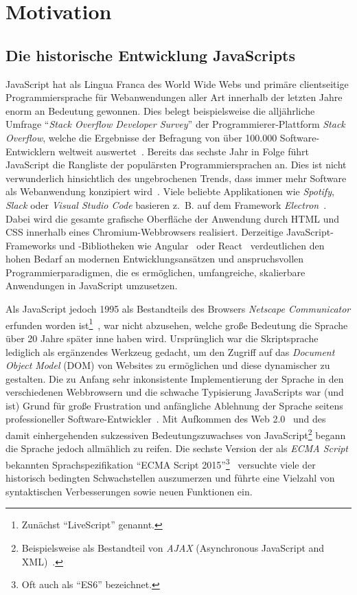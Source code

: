 \chapter{Motivation}

\section{Die historische Entwicklung JavaScripts}

JavaScript hat als Lingua Franca des World Wide Webs und primäre clientseitige Programmiersprache für Webanwendungen aller Art innerhalb der letzten Jahre enorm an Bedeutung gewonnen. Dies belegt beispielsweise die alljährliche Umfrage \enquote{\emph{Stack Overflow Developer Survey}} der Programmierer-Plattform \emph{Stack Overflow}, welche die Ergebnisse der Befragung von über 100.000 Software-Entwicklern weltweit auswertet~\autocite{stackoverflow:survey:2018}. Bereits das sechste Jahr in Folge führt JavaScript die Rangliste der populärsten Programmiersprachen an. Dies ist nicht verwunderlich hinsichtlich des ungebrochenen Trends, dass immer mehr Software als Webanwendung konzipiert wird~\autocite{taivalsaari:2017}\autocite{casteleyn:2014:ria}. Viele beliebte Applikationen wie \emph{Spotify}, \emph{Slack} oder \emph{Visual Studio Code} basieren z.~B. auf dem Framework \emph{Electron}~\autocite{electron}. Dabei wird die gesamte grafische Oberfläche der Anwendung durch HTML und CSS innerhalb eines Chromium-Webbrowsers realisiert. Derzeitige JavaScript-Frameworks und -Bibliotheken wie Angular~\autocite{angular} oder React~\autocite{react} verdeutlichen den hohen Bedarf an modernen Entwicklungsansätzen und anspruchsvollen Programmierparadigmen, die es ermöglichen, umfangreiche, skalierbare Anwendungen in JavaScript umzusetzen.

Als JavaScript jedoch 1995 als Bestandteils des Browsers \emph{Netscape Communicator} erfunden worden ist\footnote{Zunächst \enquote{LiveScript} genannt.}~\autocite{severance:2012:js10days}, war nicht abzusehen, welche große Bedeutung die Sprache über 20 Jahre später inne haben wird. Ursprünglich war die Skriptsprache lediglich als ergänzendes Werkzeug gedacht, um den Zugriff auf das \emph{Document Object Model} (DOM) von Websites zu ermöglichen und diese dynamischer zu gestalten. Die zu Anfang sehr inkonsistente Implementierung der Sprache in den verschiedenen Webbrowsern und die schwache Typisierung JavaScripts war (und ist) Grund für große Frustration und anfängliche Ablehnung der Sprache seitens professioneller Software-Entwickler~\autocite{oreilly:2001:js}.
Mit Aufkommen des Web 2.0~\autocite{oreilly:2005:web20} und des damit einhergehenden sukzessiven Bedeutungszuwachses von JavaScript\footnote{Beispielsweise als Bestandteil von \emph{AJAX} (Asynchronous JavaScript and XML)~\autocite{garret:ajax}.} begann die Sprache jedoch allmählich zu reifen. Die sechste Version der als \emph{ECMA Script} bekannten Sprachspezifikation \enquote{ECMA Script 2015}\footnote{Oft auch als \enquote{ES6} bezeichnet.}~\autocite{ecmascript:2015} versuchte viele der historisch bedingten Schwachstellen auszumerzen und führte eine Vielzahl von syntaktischen Verbesserungen sowie neuen Funktionen ein.

